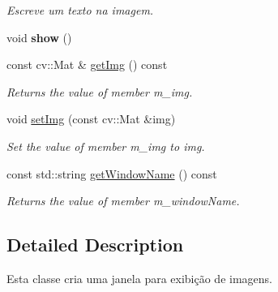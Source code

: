 \begin{DoxyCompactItemize}
\begin{DoxyCompactList}\small\item\em Escreve um texto na imagem. \end{DoxyCompactList}\item 
\hypertarget{class_viscv_1_1_cv_image_g_u_i_a4b148f40a95444d5669406b918ad2f52}{}void {\bfseries show} ()\label{class_viscv_1_1_cv_image_g_u_i_a4b148f40a95444d5669406b918ad2f52}

\item 
\hypertarget{class_viscv_1_1_cv_image_g_u_i_a128346d089624c27ffddb80f0526dc24}{}const cv\+::\+Mat \& \hyperlink{class_viscv_1_1_cv_image_g_u_i_a128346d089624c27ffddb80f0526dc24}{get\+Img} () const \label{class_viscv_1_1_cv_image_g_u_i_a128346d089624c27ffddb80f0526dc24}

\begin{DoxyCompactList}\small\item\em Returns the value of member \textquotesingle{}m\+\_\+img\textquotesingle{}. \end{DoxyCompactList}\item 
\hypertarget{class_viscv_1_1_cv_image_g_u_i_a4ae2d7fd59643d69dfe83dff37582501}{}void \hyperlink{class_viscv_1_1_cv_image_g_u_i_a4ae2d7fd59643d69dfe83dff37582501}{set\+Img} (const cv\+::\+Mat \&img)\label{class_viscv_1_1_cv_image_g_u_i_a4ae2d7fd59643d69dfe83dff37582501}

\begin{DoxyCompactList}\small\item\em Set the value of member \textquotesingle{}m\+\_\+img\textquotesingle{} to \textquotesingle{}img\textquotesingle{}. \end{DoxyCompactList}\item 
\hypertarget{class_viscv_1_1_cv_image_g_u_i_afb48ea0df1b0f3d228839536031af917}{}const std\+::string \hyperlink{class_viscv_1_1_cv_image_g_u_i_afb48ea0df1b0f3d228839536031af917}{get\+Window\+Name} () const \label{class_viscv_1_1_cv_image_g_u_i_afb48ea0df1b0f3d228839536031af917}

\begin{DoxyCompactList}\small\item\em Returns the value of member \textquotesingle{}m\+\_\+window\+Name\textquotesingle{}. \end{DoxyCompactList}\end{DoxyCompactItemize}


\subsection{Detailed Description}
Esta classe cria uma janela para exibição de imagens. 

